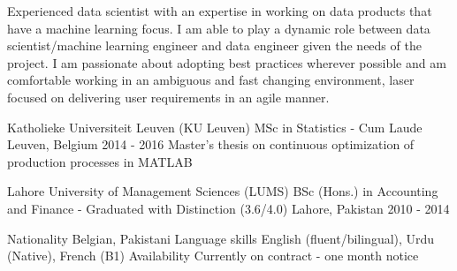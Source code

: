 \begin{cvparagraph}

\vspace{1mm}

Experienced data scientist with an expertise in working on data products that have a machine learning focus. I am able to play a dynamic role between data scientist/machine learning engineer and data engineer given the needs of the project. I am passionate about adopting best practices wherever possible and am comfortable working in an ambiguous and fast changing environment, laser focused on delivering user requirements in an agile manner.
\end{cvparagraph}

\vspace{2mm}
\begin{cventries}
  \cventry
    {Katholieke Universiteit Leuven (KU Leuven)} %
    {MSc in Statistics - Cum Laude} %
    {Leuven, Belgium} %
    {2014 - 2016} %
    {Master's thesis on continuous optimization of production processes in MATLAB}

  \cventry
    {Lahore University of Management Sciences (LUMS)} %
    {BSc (Hons.) in Accounting and Finance - Graduated with Distinction (3.6/4.0)} %
    {Lahore, Pakistan} %
    {2010 - 2014} %
    {}
\end{cventries}

\vspace{-5mm}

\vspace{2mm}

\begin{cvskills}
    \cvskill
    {Nationality} %
    {Belgian, Pakistani}
    \cvskill
    {Language skills}
    {English (fluent/bilingual), Urdu (Native), French (B1)}
    \cvskill
    {Availability}
    {Currently on contract - one month notice}
\end{cvskills}

